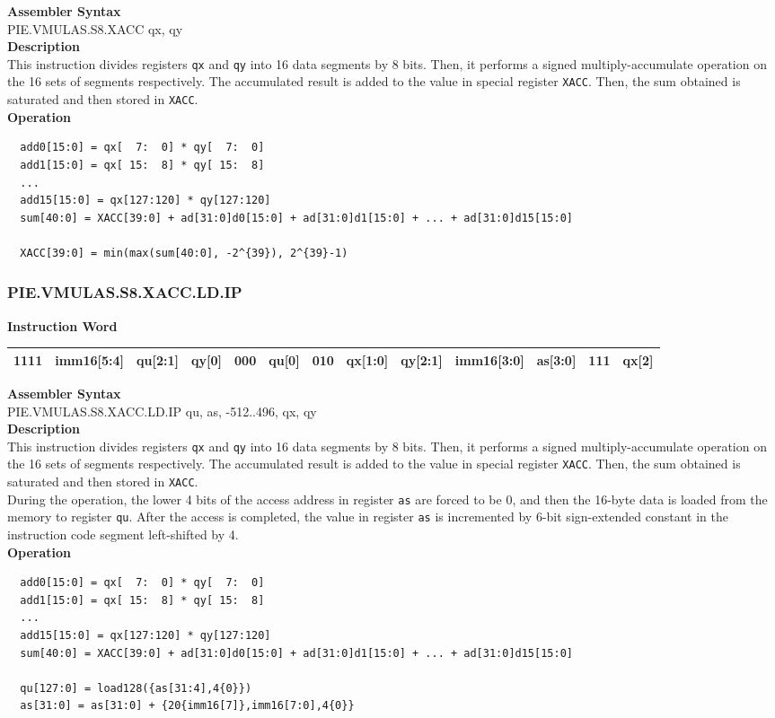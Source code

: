 \textbf{Assembler Syntax} \\
PIE.VMULAS.S8.XACC qx, qy \\
\textbf{Description} \\
This instruction divides registers \lstinline{qx} and \lstinline{qy} into 16 data segments by 8 bits. Then, it performs a signed multiply-accumulate operation on the 16 sets of segments respectively. The accumulated result is added to the value in special register \lstinline{XACC}. Then, the sum obtained is saturated and then stored in \lstinline{XACC}.\\
\textbf{Operation}
\begin{lstlisting}
  add0[15:0] = qx[  7:  0] * qy[  7:  0]
  add1[15:0] = qx[ 15:  8] * qy[ 15:  8]
  ...
  add15[15:0] = qx[127:120] * qy[127:120]
  sum[40:0] = XACC[39:0] + ad[31:0]d0[15:0] + ad[31:0]d1[15:0] + ... + ad[31:0]d15[15:0]

  XACC[39:0] = min(max(sum[40:0], -2^{39}), 2^{39}-1)
\end{lstlisting}

\newpage
\subsubsection{PIE.VMULAS.S8.XACC.LD.IP}\label{instruction:PIEVMULASS8XACCLDIP}
\setlength\tabcolsep{6pt}
\textbf{Instruction Word} \\
\begin{tabular}{|c|c|c|c|c|c|c|c|c|c|c|c|c|}
	\hline
	1111 & imm16[5:4] & qu[2:1] & qy[0] & 000 & qu[0] & 010 & qx[1:0] & qy[2:1] & imm16[3:0] & as[3:0] & 111 & qx[2] \\
	\hline
\end{tabular}

\textbf{Assembler Syntax} \\
PIE.VMULAS.S8.XACC.LD.IP qu, as, -512..496, qx, qy \\
\textbf{Description} \\
This instruction divides registers \lstinline{qx} and \lstinline{qy} into 16 data segments by 8 bits. Then, it performs a signed multiply-accumulate operation on the 16 sets of segments respectively. The accumulated result is added to the value in special register \lstinline{XACC}. Then, the sum obtained is saturated and then stored in \lstinline{XACC}. \\ During the operation, the lower 4 bits of the access address in register \lstinline{as} are forced to be 0, and then the 16-byte data is loaded from the memory to register \lstinline{qu}. After the access is completed, the value in register \lstinline{as} is incremented by 6-bit sign-extended constant in the instruction code segment left-shifted by 4.\\
\textbf{Operation}
\begin{lstlisting}
  add0[15:0] = qx[  7:  0] * qy[  7:  0]
  add1[15:0] = qx[ 15:  8] * qy[ 15:  8]
  ...
  add15[15:0] = qx[127:120] * qy[127:120]
  sum[40:0] = XACC[39:0] + ad[31:0]d0[15:0] + ad[31:0]d1[15:0] + ... + ad[31:0]d15[15:0]

  qu[127:0] = load128({as[31:4],4{0}})
  as[31:0] = as[31:0] + {20{imm16[7]},imm16[7:0],4{0}}
\end{lstlisting}

